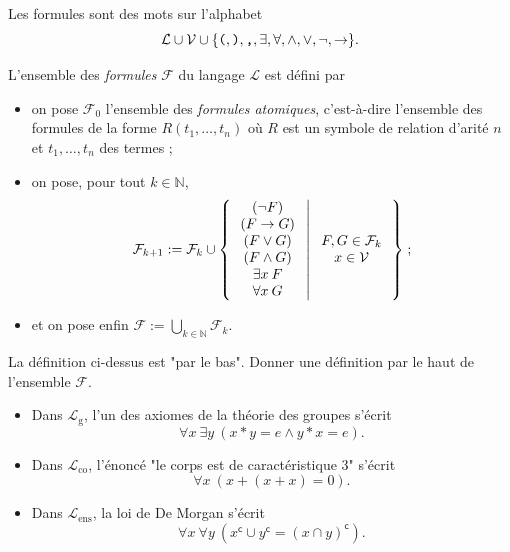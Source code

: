\documentclass[./main]{subfiles}
\begin{document}
  \begin{defn}
    Les formules sont des mots sur l'alphabet \[ \mathcal{L} \cup \mathcal{V} \cup \{\verb|(|, \verb|)|, \verb|,|, \exists, \forall, \land, \lor, \lnot, \to \}. \]

    L'ensemble des \textit{formules} $\mathcal{F}$ du langage $\mathcal{L}$ est défini par 
    \begin{itemize}
      \item on pose $\mathcal{F}_0$ l'ensemble des \textit{formules atomiques}, c'est-à-dire l'ensemble des formules de la forme $R(t_1, \ldots, t_n)$ où $R$ est un symbole de relation d'arité $n$ et $t_1, \ldots, t_n$ des termes ;
      \item on pose, pour tout $k \in \mathds{N}$,
        \[
          \mathcal{F}_{k+1} := \mathcal{F}_k \cup \mleft\{\,
            \begin{array}{c}
              (\lnot F)\\
              (F \to G)\\
              (F \lor G)\\
              (F \land G)\\
              \exists x\: F\\
            \forall x\: G\\
            \end{array}
          \;\middle|\; 
          \begin{array}{c}
            F,G \in \mathcal{F}_k\\
            x \in \mathcal{V}
          \end{array}
        \,\mright\} \;
        ;\] 
      \item et on pose enfin $\mathcal{F} := \bigcup_{k \in \mathds{N}} \mathcal{F}_k$.
    \end{itemize}
  \end{defn}

  \begin{exo}
    La définition ci-dessus est "par le bas". Donner une définition par le haut de l'ensemble $\mathcal{F}$.
  \end{exo}

  \begin{exm}
    \begin{itemize}
      \item Dans $\mathcal{L}_\mathrm{g}$, l'un des axiomes de la théorie des groupes s'écrit \[
        \forall x\: \exists y\: (x * y = e \land y * x = e)
        .\]
      \item Dans $\mathcal{L}_\mathrm{co}$, l'énoncé "le corps est de caractéristique 3" s'écrit \[
        \forall x\: (x + (x + x) = 0)
        .\] 
      \item Dans $\mathcal{L}_\mathrm{ens}$, la loi de De Morgan s'écrit \[
          \forall x\: \forall y\: (x^\mathsf{c} \cup y^\mathsf{c} = (x \cap y)^\mathsf{c})
        .\]
    \end{itemize}
  \end{exm}
\end{document}
